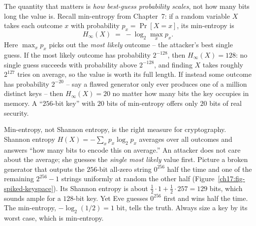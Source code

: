 The quantity that matters is \emph{how best-guess probability scales}, not how many bits long the value is. Recall min-entropy from Chapter~7: if a random variable $X$ takes each outcome $x$ with probability $p_x = \Pr[X = x]$, its min-entropy is
\[
  H_\infty(X) \;=\; -\log_2 \max_x p_x .
\]
Here $\max_x p_x$ picks out the \emph{most likely} outcome -- the attacker's best single guess. If the most likely outcome has probability $2^{-128}$, then $H_\infty(X) = 128$: no single guess succeeds with probability above $2^{-128}$, and finding $X$ takes roughly $2^{127}$ tries on average, so the value is worth its full length. If instead some outcome has probability $2^{-20}$ -- say a flawed generator only ever produces one of a million distinct keys -- then $H_\infty(X) = 20$ no matter how many bits the key occupies in memory. A ``$256$-bit key'' with $20$ bits of min-entropy offers only $20$ bits of real security.

\begin{focusbox}
Min-entropy, not Shannon entropy, is the right measure for cryptography. Shannon entropy $H(X) = -\sum_x p_x \log_2 p_x$ averages over all outcomes and answers ``how many bits to encode this on average.'' An attacker does not care about the average; she guesses the \emph{single most likely} value first. Picture a broken generator that outputs the $256$-bit all-zero string $0^{256}$ half the time and one of the remaining $2^{256} - 1$ strings uniformly at random the other half (Figure~\ref{ch17:fig-spiked-keyspace}). Its Shannon entropy is about $\tfrac12 \cdot 1 + \tfrac12 \cdot 257 = 129$ bits, which sounds ample for a $128$-bit key. Yet Eve guesses $0^{256}$ first and wins half the time. The min-entropy, $-\log_2(1/2) = 1$ bit, tells the truth. Always size a key by its worst case, which is min-entropy.
\end{focusbox}

